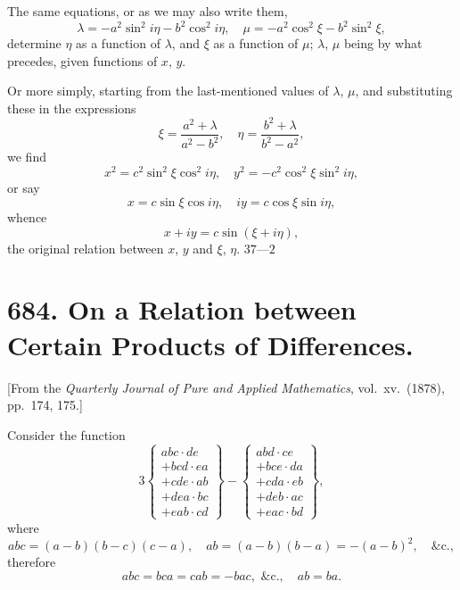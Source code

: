 \documentclass[12pt,a4paper]{article}
\theoremstyle{cayley}
\theoremstyle{definition}
\numberwithin{equation}{section}
\begin{document}
The same equations, or as we may also write them,
\[
\lambda = -a^2 \sin^2 i\eta - b^2 \cos^2 i\eta, \quad \mu = -a^2 \cos^2 \xi - b^2 \sin^2 \xi,
\]
determine $\eta$ as a function of $\lambda$, and $\xi$ as a function of $\mu$; $\lambda$, $\mu$ being by what precedes, given functions of $x$, $y$.

Or more simply, starting from the last-mentioned values of $\lambda$, $\mu$, and substituting these in the expressions
\[
\xi = \frac{a^2 + \lambda}{a^2 - b^2}, \quad \eta = \frac{b^2 + \lambda}{b^2 - a^2},
\]
we find
\[
x^2 = c^2 \sin^2 \xi \cos^2 i\eta, \quad y^2 = -c^2 \cos^2 \xi \sin^2 i\eta,
\]
or say
\[
x = c \sin \xi \cos i\eta, \quad iy = c \cos \xi \sin i\eta,
\]
whence
\[
x + iy = c \sin(\xi + i\eta),
\]
the original relation between $x$, $y$ and $\xi$, $\eta$.
\hfill $37\text{---}2$

\newpage

\section*{684. On a Relation between Certain Products of Differences.}

[From the \textit{Quarterly Journal of Pure and Applied Mathematics}, vol.\ xv.\ (1878), pp.\ 174, 175.]

Consider the function
\[
3\left\{\begin{array}{l}
abc \cdot de \\
+ bcd \cdot ea \\
+ cde \cdot ab \\
+ dea \cdot bc \\
+ eab \cdot cd
\end{array}\right\}
-
\left\{\begin{array}{l}
abd \cdot ce \\
+ bce \cdot da \\
+ cda \cdot eb \\
+ deb \cdot ac \\
+ eac \cdot bd
\end{array}\right\},
\]
where
\[
abc = (a - b)(b - c)(c - a), \quad ab = (a - b)(b - a) = -(a - b)^2, \quad \text{\&c.},
\]
therefore
\[
abc = bca = cab = -bac, \text{ \&c.}, \quad ab = ba.
\]
\end{document}
